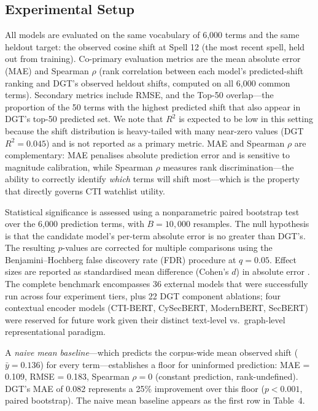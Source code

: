 \documentclass[12pt]{article}
\begin{document}
\subsection{Experimental Setup}

All models are evaluated on the same vocabulary of 6,000 terms and the same heldout target: the observed cosine shift at Spell 12 (the most recent spell, held out from training). Co-primary evaluation metrics are the mean absolute error (MAE) and Spearman $\rho$ (rank correlation between each model's predicted-shift ranking and DGT's observed heldout shifts, computed on all 6,000 common terms). Secondary metrics include RMSE, and the Top-50 overlap---the proportion of the 50 terms with the highest predicted shift that also appear in DGT's top-50 predicted set. We note that $R^2$ is expected to be low in this setting because the shift distribution is heavy-tailed with many near-zero values (DGT $R^2 = 0.045$) and is not reported as a primary metric. MAE and Spearman $\rho$ are complementary: MAE penalises absolute prediction error and is sensitive to magnitude calibration, while Spearman $\rho$ measures rank discrimination---the ability to correctly identify \textit{which} terms will shift most---which is the property that directly governs CTI watchlist utility.

Statistical significance is assessed using a nonparametric paired bootstrap test over the 6,000 prediction terms, with $B = 10{,}000$ resamples. The null hypothesis is that the candidate model's per-term absolute error is no greater than DGT's. The resulting $p$-values are corrected for multiple comparisons using the Benjamini--Hochberg false discovery rate (FDR) procedure \parencite{benjamini1995} at $q = 0.05$. Effect sizes are reported as standardised mean difference (Cohen's $d$) in absolute error \parencite{cohen1988}. The complete benchmark encompasses 36 external models that were successfully run across four experiment tiers, plus 22 DGT component ablations; four contextual encoder models (CTI-BERT, CySecBERT, ModernBERT, SecBERT) were reserved for future work given their distinct text-level vs.\ graph-level representational paradigm.

A \textit{naive mean baseline}---which predicts the corpus-wide mean observed shift ($\bar{y} = 0.136$) for every term---establishes a floor for uninformed prediction: MAE = 0.109, RMSE = 0.183, Spearman $\rho = 0$ (constant prediction, rank-undefined). DGT's MAE of 0.082 represents a 25\% improvement over this floor ($p < 0.001$, paired bootstrap). The naive mean baseline appears as the first row in Table~4.
\end{document}
